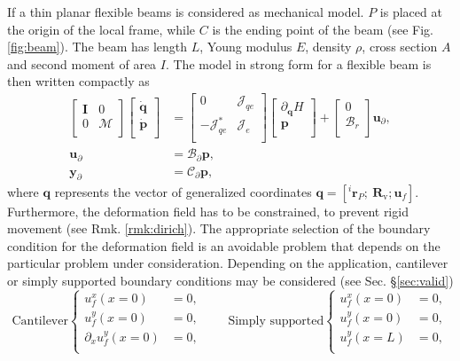 \documentclass{svjour3}                     %
\newcommand{\secref}[1]{\S\ref{#1}}
\begin{document}
If a thin planar flexible beams is considered as mechanical model. $P$ is placed at the origin of the local frame, while $C$ is the ending point of the beam (see Fig. \ref{fig:beam}). The beam has length $L$, Young modulus $E$, density $\rho$, cross section $A$ and second moment of area $I$. The model in strong form for a flexible beam is then written compactly as 
\begin{equation}
\label{eq:EB_str_phdae}
\begin{aligned}
\begin{bmatrix}
\bm{I} & 0 \\
0 & \bm{\mathcal{M}} \\
\end{bmatrix}
\begin{bmatrix}
\dot{\bm{q}} \\
\dot{\bm{p}} \\
\end{bmatrix}
&= \begin{bmatrix}
0 & \bm{\mathcal{J}}_{qe} \\
-\bm{\mathcal{J}}_{qe}^* & \bm{\mathcal{J}}_e \\
\end{bmatrix}
\begin{bmatrix}
\partial_{\bm{q}} H \\
\bm{p}  \\
\end{bmatrix} + 
\begin{bmatrix}
0 \\
\bm{\mathcal{B}}_r \\
\end{bmatrix} \bm{u}_\partial, \\
\bm{u}_\partial &= \bm{\mathcal{B}}_{\partial} \bm{p}, \\
\bm{y}_\partial &= \bm{\mathcal{C}}_{\partial} \bm{p},
\end{aligned}
\end{equation}
where $\bm{q}$ represents the vector of generalized coordinates $\bm{q} = [^i\bm{r}_P; \ \bm{R}_{\text{v}}; \bm{u}_f]$.
Furthermore, the deformation field has to be constrained, to prevent rigid movement (see Rmk. \ref{rmk:dirich}). The appropriate selection of the boundary condition for the deformation field is an avoidable problem that depends on the particular problem under consideration.  Depending on the application, cantilever or simply supported boundary conditions may be considered (see Sec. \secref{sec:valid})
\begin{equation*}
	\text{Cantilever}
	\begin{cases}
	u_f^x(x=0) &= 0, \\
	u_f^y(x=0) &= 0, \\
	\partial_x u_f^y(x=0) &= 0, \\
	\end{cases} \qquad 
	\text{Simply supported}
	\begin{cases}
	u_f^x(x=0) &= 0, \\
	u_f^y(x=0) &= 0, \\
	u_f^y(x=L) &= 0, \\
	\end{cases}
\end{equation*}
\end{document}
